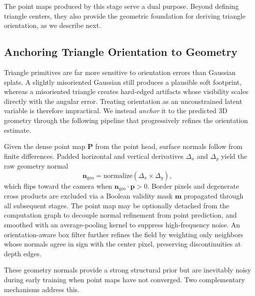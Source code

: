 The point maps produced by this stage serve a dual purpose. Beyond defining triangle centers, they also provide the geometric foundation for deriving triangle orientation, as we describe next.

\subsection{Anchoring Triangle Orientation to Geometry}
\label{sec:normal_pipeline}

Triangle primitives are far more sensitive to orientation errors than Gaussian splats. A slightly misoriented Gaussian still produces a plausible soft footprint, whereas a misoriented triangle creates hard-edged artifacts whose visibility scales directly with the angular error. Treating orientation as an unconstrained latent variable is therefore impractical. We instead \emph{anchor} it to the predicted 3D geometry through the following 
pipeline that progressively refines the orientation estimate.

Given the dense point map $\mathbf{P}$ from the point head, surface normals follow from finite differences. Padded horizontal and vertical derivatives $\Delta_x$ and $\Delta_y$ yield the raw geometry normal
\begin{equation}
    \mathbf{n}_{\mathrm{geo}} = \mathrm{normalize}(\Delta_x \times \Delta_y),
    \label{eq:geo_normal}
\end{equation}
which flips toward the camera when $\mathbf{n}_{\mathrm{geo}} \cdot \mathbf{p} > 0$. Border pixels and degenerate cross products are excluded via a Boolean validity mask $\mathbf{m}$ propagated through all subsequent stages. The point map may be optionally detached from the computation graph to decouple normal refinement from point prediction, and smoothed with an average-pooling kernel to suppress high-frequency noise. An orientation-aware box filter further refines the field by weighting only neighbors whose normals agree in sign with the center pixel, preserving discontinuities at depth edges.

These geometry normals provide a strong structural prior but are inevitably noisy during early training when point maps have not converged. Two complementary mechanisms address this.


